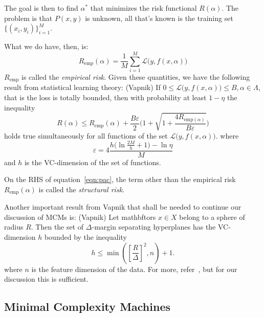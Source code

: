 \documentclass[11pt]{article}
\begin{document}
The goal is then to find $\alpha^*$ that minimizes the risk functional
$R(\alpha)$. The problem is that $P(x,y)$ is unknown, all that's known is the
training set $\{(x_i,y_i)\}_{i=1}^M$.\par
What we do have, then, is:
\begin{equation}
    R_{\text{emp}}(\alpha)=\frac{1}{M}\sum_{i=1}^M
    \mathcal{L}\bigl(y,f(x,\alpha)\bigr)
\end{equation}
$R_{\text{emp}}$ is called the {\em empirical risk}. Given these quantities, we
have the following result from statistical learning theory:
{\theorem (Vapnik) If $0\le\mathcal{L}\bigl(y,f(x,\alpha)\bigr)\le
B,\alpha\in\Lambda$, that is the loss is totally bounded, then with
probability at least $1-\eta$ the inequality
\begin{equation}
    \label{eqn:pac}
    R(\alpha)\le
    R_{\text{emp}}(\alpha)+\frac{B\varepsilon}{2}\Biggl(1+\sqrt{1+\frac{4R_{\text{emp}(\alpha)}}{B\varepsilon}}\Biggr)
\end{equation}
holds true simultaneously for all functions of the set
$\mathcal{L}\bigl(y,f(x,\alpha)\bigr)$. where
\begin{equation}
    \label{eq:vareps}
    \varepsilon = 4\frac{h\biggl(\ln\frac{2M}{h}+1\biggr)-\ln\eta}{M}
\end{equation} and $h$ is the VC-dimension of the set of functions.}\par
On the RHS of equation~\ref{eqn:pac}, the term other than the empirical risk
$R_{\text{emp}}(\alpha)$ is called the {\em structural risk}.\par
Another important result from Vapnik that shall be needed to continue our
discussion of MCMs is:
{\theorem (Vapnik) Let mathbftors $x\in X$ belong to a sphere of radius $R$. Then
the set of $\Delta$-margin separating hyperplanes has the VC-dimension $h$
bounded by the inequality
\begin{equation}
    \label{eqn:vcbound}
    h\le\min\left(\left[\frac{R}{\Delta}\right]^2,n\right)+1.
\end{equation}} where $n$ is the feature dimension of the data.
For more, refer~\cite{slt}, but for our discussion this is sufficient.\par
\subsection{Minimal Complexity Machines}
\end{document}
